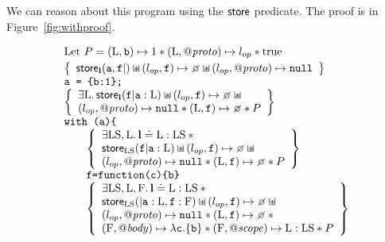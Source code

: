 \documentclass{article}
\begin{document}
We can reason about this program using the $\mathsf{store}$ predicate. The proof is in Figure~\ref{fig:withproof}.
\begin{figure}
\[
\begin{array}{l}
        \text{Let }P = (\V{L},\js{b})\pointsto 1 \sep (\V{L},\protop)\pointsto\lop \sep \true \\[1mm]
        \left\{\begin{array}{l}
                \store_{\ls}(\js{a},\js{f}|) \sepish(\lop,\js{f})\pointsto\none \sepish(\lop,\protop)\pointsto\nil
        \end{array}\right\}\\
        \js{a = \{b:1\};}\\
        \left\{\begin{array}{l}
                \exists\V{L}\st\store_{\ls}(\js{f}|\js{a}:\V{L})\sepish(\lop,\js{f})\pointsto\none \sepish{}\\(\lop,\protop)\pointsto\nil\sep 
                (\V{L},\js{f})\pointsto\none \sep P
        \end{array}\right\}\\
        \js{with (a)\{}\\
                \qquad\left\{\begin{array}{l}
                        \exists\V{LS},\V{L}\st\ls\doteq\V{L}:\V{LS} \sep {} \\
                        \store_{\V{LS}}(\js{f}|\js{a}:\V{L})\sepish(\lop,\js{f})\pointsto\none \sepish{}\\(\lop,\protop)\pointsto\nil\sep 
                        (\V{L},\js{f})\pointsto\none\sep P
                \end{array}\right\}\\
                \qquad \js{f=function(c)\{b\}}\\
                \qquad\left\{\begin{array}{l}
                        \exists\V{LS},\V{L},\V{F}\st\ls\doteq\V{L}:\V{LS} \sep {} \\
                        \store_{\V{LS}}(|\js{a}:\V{L},\js{f}:\V{F})\sepish(\lop,\js{f})\pointsto\none\sepish{}\\(\lop,\protop)\pointsto\nil \sep 
                        (\V{L},\js{f})\pointsto\none \sep {}\\
                        (\V{F},\bodyp)\pointsto \lambda\js{c}.\{\js{b}\} \sep
                        (\V{F},\fscopep)\pointsto \V{L}:\V{LS}\sep P
                \end{array}\right\}\\

\end{array}\]
\end{figure}
\end{document}
